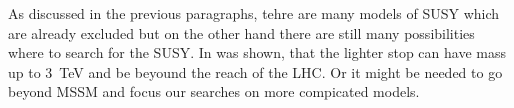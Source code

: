 As discussed in the previous paragraphs, tehre are many models of SUSY which are already excluded but on the other hand there are still many possibilities where to search for the SUSY. In was shown, that the lighter stop can have mass up to 3~TeV and be beyound the reach of the LHC. Or it might be needed to go beyond MSSM and focus our searches on more compicated models.

